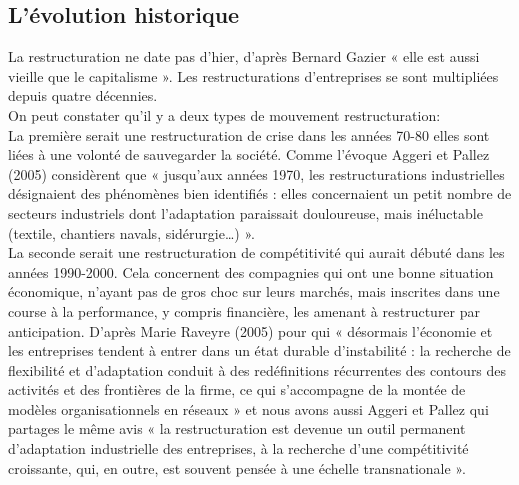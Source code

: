 \documentclass[12pt,a4paper]{article}
\begin{document}

\subsection{L'évolution historique}

La restructuration ne date pas d'hier, d'après Bernard Gazier « elle est aussi vieille que le capitalisme ». Les restructurations d’entreprises se sont multipliées depuis quatre décennies.\\ 

On peut constater qu'il y a deux types de mouvement restructuration:\\

La première serait une restructuration de crise dans les années 70-80 elles sont liées à une volonté de sauvegarder la société. Comme l'évoque Aggeri et Pallez (2005) considèrent que « jusqu’aux années 1970, les restructurations industrielles désignaient des phénomènes bien identifiés : elles concernaient un petit nombre de secteurs industriels dont l’adaptation paraissait douloureuse, mais inéluctable (textile, chantiers navals, sidérurgie…) ».\\

La seconde serait une restructuration de compétitivité qui aurait débuté dans les années 1990-2000. Cela concernent des compagnies qui ont une bonne situation économique, n'ayant pas de gros choc sur leurs marchés, mais inscrites dans une course à la performance, y compris financière, les amenant à restructurer par anticipation. D'après Marie Raveyre (2005) pour qui « désormais l’économie et les entreprises tendent à entrer dans un état durable d’instabilité : la recherche de flexibilité et d’adaptation conduit à des redéfinitions récurrentes des contours des activités et des frontières de la firme, ce qui s’accompagne de la montée de modèles organisationnels en réseaux » et nous avons aussi Aggeri et Pallez qui partages le même avis « la restructuration est devenue un outil permanent d’adaptation industrielle des entreprises, à la recherche d’une compétitivité croissante, qui, en outre, est souvent pensée à une échelle transnationale ».\\
\end{document}
